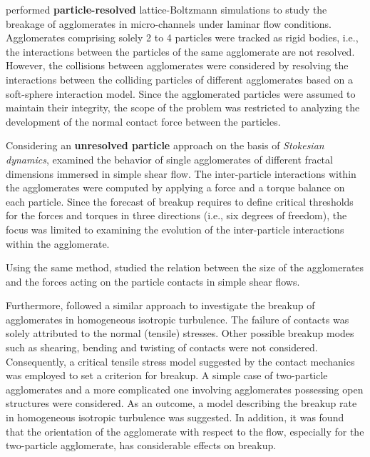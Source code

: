 \citet{derksen2010potential} performed \textbf{particle-resolved}
lattice-Boltzmann simulations to study the breakage of agglomerates in
micro-channels under laminar flow conditions.  Agglomerates comprising
solely 2 to 4 particles were tracked as rigid bodies, i.e., the
interactions between the particles of the same agglomerate are not
resolved. However, the collisions between agglomerates were considered
by resolving the interactions between the colliding particles of
different agglomerates based on a soft-sphere interaction model. Since
the agglomerated particles were assumed to maintain their integrity,
the scope of the problem was restricted to analyzing the development
of the normal contact force between the particles. \newline 

Considering an \textbf{unresolved particle} approach on the basis of
\emph{Stokesian dynamics}, \citet{vanni2011hydrodynamic} examined the
behavior of single agglomerates of different fractal dimensions
immersed in simple shear flow. The inter-particle interactions within
the agglomerates were computed by applying a force and a torque
balance on each particle. Since the forecast of breakup requires to
define critical thresholds for the forces and torques in three
directions (i.e., six degrees of freedom), the focus was limited to
examining the evolution of the inter-particle interactions within the
agglomerate. 

 Using the same method, \citet{seto2011hydrodynamic}
studied the relation between the size of the agglomerates and the
forces acting on the particle contacts in simple shear
flows. 

Furthermore, \citet{debona2014} followed a similar approach to
investigate the breakup of agglomerates in homogeneous isotropic
turbulence. The failure of contacts was solely attributed to the
normal (tensile) stresses. Other possible breakup modes such as
shearing, bending and twisting of contacts were not considered.
Consequently, a critical tensile stress model suggested by the contact
mechanics was employed to set a criterion for breakup. A simple case
of two-particle agglomerates and a more complicated one involving
agglomerates possessing open structures were considered.  As an
outcome, a model describing the breakup rate in homogeneous isotropic
turbulence was suggested.  In addition, it was found that the
orientation of the agglomerate with respect to the flow, especially
for the two-particle agglomerate, has considerable effects on breakup.

